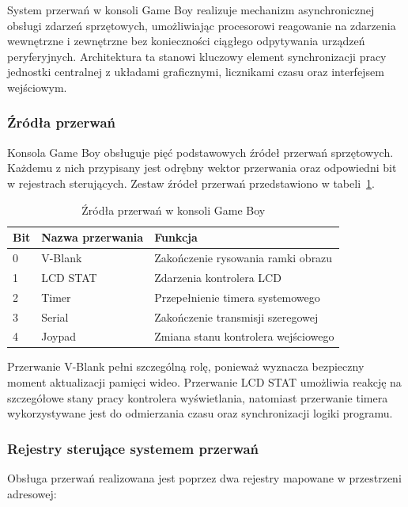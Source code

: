 \documentclass{article}
\begin{document}
System przerwań w konsoli Game Boy realizuje mechanizm asynchronicznej obsługi zdarzeń sprzętowych, umożliwiając procesorowi reagowanie na zdarzenia wewnętrzne i zewnętrzne bez konieczności ciągłego odpytywania urządzeń peryferyjnych. Architektura ta stanowi kluczowy element synchronizacji pracy jednostki centralnej z układami graficznymi, licznikami czasu oraz interfejsem wejściowym.

\subsubsection{Źródła przerwań}

Konsola Game Boy obsługuje pięć podstawowych źródeł przerwań sprzętowych. Każdemu z nich przypisany jest odrębny wektor przerwania oraz odpowiedni bit w rejestrach sterujących. Zestaw źródeł przerwań przedstawiono w tabeli~\ref{tab:gb_interrupts}.

\begin{table}[h]
	\centering
	\begin{tabular}{lll}
		\hline
		Bit & Nazwa przerwania & Funkcja \\
		\hline
		0 & V-Blank & Zakończenie rysowania ramki obrazu \\
		1 & LCD STAT & Zdarzenia kontrolera LCD \\
		2 & Timer & Przepełnienie timera systemowego \\
		3 & Serial & Zakończenie transmisji szeregowej \\
		4 & Joypad & Zmiana stanu kontrolera wejściowego \\
		\hline
	\end{tabular}
	\caption{Źródła przerwań w konsoli Game Boy\cite{pandocs}}
	\label{tab:gb_interrupts}
\end{table}

Przerwanie V-Blank pełni szczególną rolę, ponieważ wyznacza bezpieczny moment aktualizacji pamięci wideo. Przerwanie LCD STAT umożliwia reakcję na szczegółowe stany pracy kontrolera wyświetlania, natomiast przerwanie timera wykorzystywane jest do odmierzania czasu oraz synchronizacji logiki programu.

\subsubsection{Rejestry sterujące systemem przerwań}

Obsługa przerwań realizowana jest poprzez dwa rejestry mapowane w przestrzeni adresowej:
\end{document}
